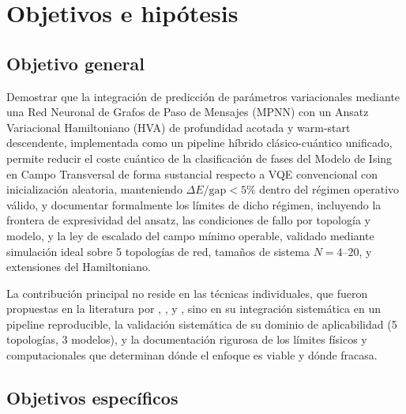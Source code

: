 \documentclass[11pt,a4paper,spanish]{book}
\begin{document}

\chapter{Objetivos e hipótesis}

\section{Objetivo general}

Demostrar que la integración de predicción de parámetros variacionales mediante una Red Neuronal de Grafos de Paso de Mensajes (MPNN) con un Ansatz Variacional Hamiltoniano (HVA) de profundidad acotada y warm-start descendente, implementada como un pipeline híbrido clásico-cuántico unificado, permite reducir el coste cuántico de la clasificación de fases del Modelo de Ising en Campo Transversal de forma sustancial respecto a VQE convencional con inicialización aleatoria, manteniendo $\Delta E/\text{gap} < 5\%$ dentro del régimen operativo válido, y documentar formalmente los límites de dicho régimen, incluyendo la frontera de expresividad del ansatz, las condiciones de fallo por topología y modelo, y la ley de escalado del campo mínimo operable, validado mediante simulación ideal sobre 5 topologías de red, tamaños de sistema $N = 4$--$20$, y extensiones del Hamiltoniano.

La contribución principal no reside en las técnicas individuales, que fueron propuestas en la literatura por \citet{miao2024}, \citet{zhang2025}, \citet{wiersema2020} y \citet{puig2025}, sino en su integración sistemática en un pipeline reproducible, la validación sistemática de su dominio de aplicabilidad (5 topologías, 3 modelos), y la documentación rigurosa de los límites físicos y computacionales que determinan dónde el enfoque es viable y dónde fracasa.

\section{Objetivos específicos}
\end{document}
